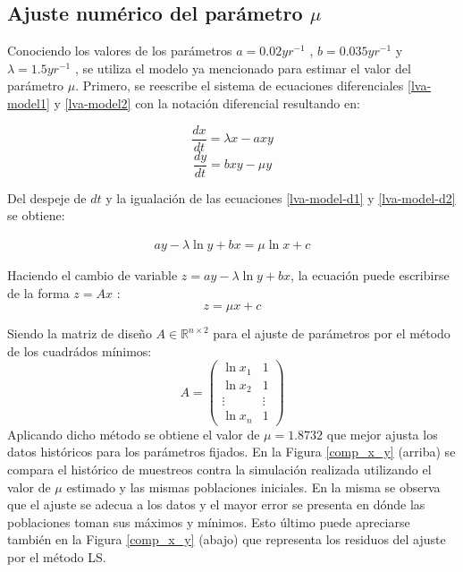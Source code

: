 \documentclass{article}
\numberwithin{equation}{section}
\begin{document}
\begin{multicols}{2}
\section{Ajuste numérico del parámetro $\mu$}
\label{puntoa}
\par Conociendo los valores de los parámetros $a = 0.02yr^{-1}$ , $b = 0.035yr^{-1}$ y $\lambda = 1.5yr^{-1}$ , se utiliza el modelo ya mencionado para estimar el valor del parámetro $\mu$. Primero, se reescribe el sistema de ecuaciones diferenciales \ref{lva-model1} y \ref{lva-model2} con la notación diferencial resultando en:

\begin{equation}
\label{lva-model-d1}
\dfrac{d x}{d t} = \lambda x - a x y
\end{equation}
\begin{equation}
\label{lva-model-d2}
\dfrac{d y}{d t} = b x y - \mu y
\end{equation}

Del despeje de $d t$ y la igualación de las ecuaciones \ref{lva-model-d1} y \ref{lva-model-d2} se obtiene:

\begin{align}
ay - \lambda \ln y +bx = \mu \ln x + c
\end{align}

Haciendo el cambio de variable $z = ay - \lambda \ln y + bx$, la ecuación puede escribirse de la forma $z = Ax$ :
\begin{equation}
z = \mu x + c 
\end{equation}

Siendo la matriz de diseño $A \in \mathbb{R} ^ {n\times 2}$ para el ajuste de parámetros por el método de los cuadrádos mínimos:\\
\begin{equation}
A = \left( \begin{array}{cc} \ln x_{1} & 1 \\ \ln x_{2} & 1 \\ \vdots & \vdots \\ \ln x_{n} & 1  \end{array} \right)
\end{equation}
Aplicando dicho método se obtiene el valor de $\mu = 1.8732$ que mejor ajusta los datos históricos para los parámetros fijados. En la Figura \ref{comp_x_y} (arriba) se compara el histórico de muestreos contra la simulación realizada utilizando el valor de $\mu$ estimado y las mismas poblaciones iniciales. En la misma se observa que el ajuste se adecua a los datos y el mayor error se presenta en dónde las poblaciones toman sus máximos y mínimos. Esto último puede apreciarse también en la Figura \ref{comp_x_y} (abajo) que representa los residuos del ajuste por el método LS.


\end{multicols}
\end{document}
